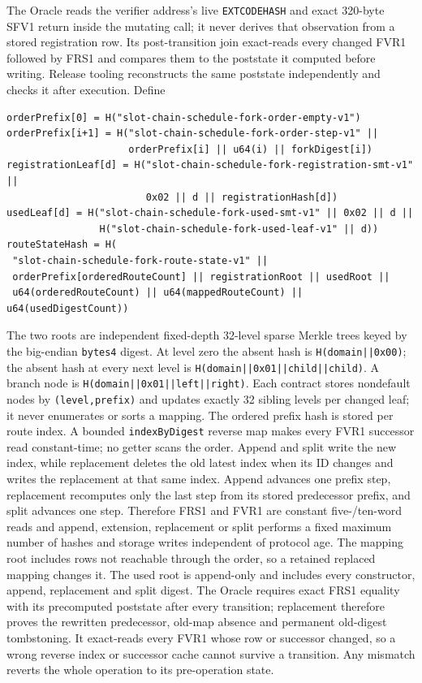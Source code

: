 \documentclass[a4paper,11pt]{article}
\newcommand{\code}[1]{\nolinkurl{#1}}
\begin{document}
The Oracle reads the verifier address's live \code{EXTCODEHASH} and exact
320-byte SFV1 return inside the mutating call; it never derives that
observation from a stored registration row.  Its post-transition join
exact-reads every changed FVR1 followed by FRS1 and compares them to the
poststate it computed before writing.  Release tooling reconstructs the same
poststate independently and checks it after execution.
Define
\begin{verbatim}
orderPrefix[0] = H("slot-chain-schedule-fork-order-empty-v1")
orderPrefix[i+1] = H("slot-chain-schedule-fork-order-step-v1" ||
                     orderPrefix[i] || u64(i) || forkDigest[i])
registrationLeaf[d] = H("slot-chain-schedule-fork-registration-smt-v1" ||
                        0x02 || d || registrationHash[d])
usedLeaf[d] = H("slot-chain-schedule-fork-used-smt-v1" || 0x02 || d ||
                H("slot-chain-schedule-fork-used-leaf-v1" || d))
routeStateHash = H(
 "slot-chain-schedule-fork-route-state-v1" ||
 orderPrefix[orderedRouteCount] || registrationRoot || usedRoot ||
 u64(orderedRouteCount) || u64(mappedRouteCount) || u64(usedDigestCount))
\end{verbatim}
The two roots are independent fixed-depth 32-level sparse Merkle trees keyed
by the big-endian \code{bytes4} digest.  At level zero the absent hash is
\code{H(domain||0x00)}; the absent hash at every next level is
\code{H(domain||0x01||child||child)}.  A branch node is
\code{H(domain||0x01||left||right)}.  Each contract stores nondefault nodes by
\code{(level,prefix)} and updates exactly 32 sibling levels per changed leaf;
it never enumerates or sorts a mapping.  The ordered prefix hash is stored per
route index.  A bounded \code{indexByDigest} reverse map makes every FVR1
successor read constant-time; no getter scans the order.  Append and split
write the new index, while replacement deletes the old latest index when its
ID changes and writes the replacement at that same index.  Append advances one
prefix step, replacement recomputes only the last step from its stored
predecessor prefix, and split advances one step.  Therefore FRS1 and FVR1 are
constant five-/ten-word reads and append, extension, replacement or split performs a fixed maximum
number of hashes and storage writes independent of protocol age.  The mapping
root includes rows not reachable through the order, so a retained replaced
mapping changes it.  The used root is append-only and includes every
constructor, append, replacement and split digest.  The Oracle requires exact
FRS1 equality with its precomputed poststate after every transition;
replacement therefore proves the rewritten predecessor, old-map absence and
permanent old-digest tombstoning.  It exact-reads every FVR1 whose row or
successor changed, so a wrong reverse index or successor cache cannot survive a
transition.  Any mismatch reverts the whole operation to its pre-operation
state.
\end{document}
